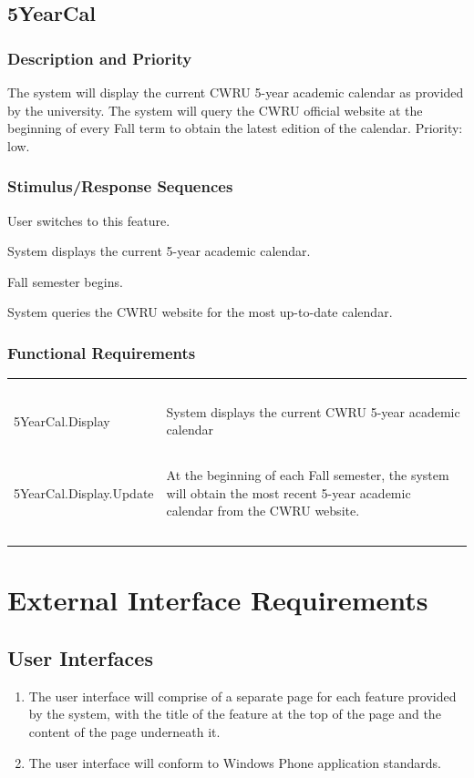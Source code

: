 \documentclass[pdftex,12pt,letter]{article}
\begin{document}
\subsection{5YearCal}
\subsubsection{Description and Priority}
The system will display the current CWRU 5-year academic calendar as provided by the university. The system will query the CWRU official website at the beginning of every Fall term to obtain the latest edition of the calendar. Priority: low.
\subsubsection{Stimulus/Response Sequences}
\begin{description}\itemsep1pt
\item[Stimulus:] User switches to this feature.
\item[Response:] System displays the current 5-year academic calendar.
\item[Stimulus:] Fall semester begins.
\item[Response:] System queries the CWRU website for the most up-to-date calendar.
\end{description}
\subsubsection{Functional Requirements}
\begin{table}[!h]
\begin{tabularx}{\textwidth}[t]{|l Y|}
\hline
~&~\\
5YearCal.Display & System displays the current CWRU 5-year academic calendar\\ 
~&~\\
5YearCal.Display.Update & At the beginning of each Fall semester, the system will obtain the most recent 5-year academic calendar from the CWRU website.\\
~&~\\
\hline
\end{tabularx}
\end{table}
\FloatBarrier
\section{External Interface Requirements}
\subsection{User Interfaces}
\begin{enumerate}[UI-1:]
\item The user interface will comprise of a separate page for each feature provided by the system, with the title of the feature at the top of the page and the content of the page underneath it.
\item The user interface will conform to Windows Phone application standards.
\end{enumerate}
\end{document}
